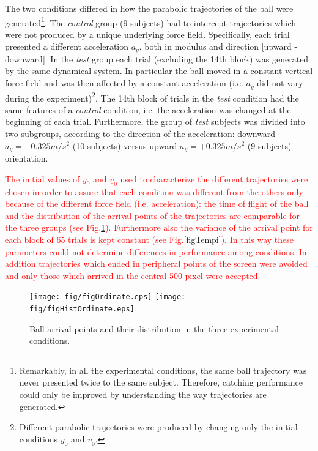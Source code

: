 The two conditions differed in how the parabolic trajectories of the ball were generated\footnote{Remarkably, in all the experimental conditions, the same ball trajectory was never presented twice to the same subject. Therefore, catching performance could only be improved by understanding the way trajectories are generated.}. The \textit{control} group (9 subjects) had to intercept trajectories which were not produced by a unique underlying force field. Specifically, each trial presented a different acceleration $a_y$, both in modulus and direction [upward - downward]. In the \textit{test} group each trial (excluding the 14th block) was generated by the same dynamical system. In particular the ball moved in a constant vertical force field and was then affected by a constant acceleration (i.e. $a_y$ did not vary during the experiment)\footnote{Different parabolic trajectories were produced by changing only the initial conditions $y_0$ and $\underline{v}_0$.}. The 14th block of trials in the \textit{test} condition had the same features of a \textit{control} condition, i.e. the acceleration was changed at the beginning of each trial. Furthermore, the group of \textit{test} subjects was divided into two subgroups, according to the direction of the acceleration: downward $a_y=-0.325 m/{s^2}$ (10 subjects) versus upward $a_y=+0.325 m/{s^2}$ (9 subjects) orientation.

\textcolor{red}{The initial values of $y_0$ and $\underline{v}_0$ used to characterize the different trajectories were chosen in order to assure that each condition was different from the others only because of the different force field (i.e. acceleration): the time of flight of the ball %
and the distribution of the arrival points of the trajectories are comparable for the three groups (see Fig.\ref{figOrdinate}). Furthermore also the variance of the arrival point for each block of 65 trials is kept constant (see Fig.\ref{figTempi}). %
In this way these parameters could not determine differences in performance among conditions. In addition trajectories which ended in peripheral points of the screen were avoided and only those which arrived in the central 500 pixel were accepted.}



\begin{figure}[tbp]
	\centering
		\texttt{[image: fig/figOrdinate.eps]}
		\texttt{[image: fig/figHistOrdinate.eps]}
	\caption{Ball arrival points and their distribution in the three experimental conditions.}
	\label{figOrdinate}
\end{figure}

